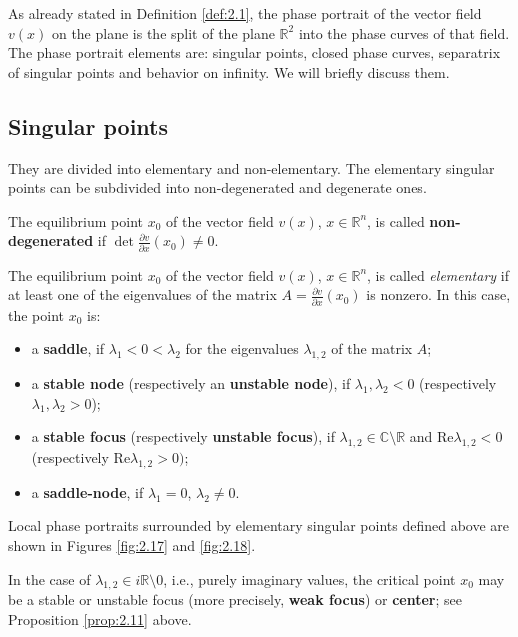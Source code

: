 As already stated in Definition \ref{def:2.1}, the phase portrait of the vector field $v (x)$ on the plane is the split of the plane $\mathbb{R}^{2}$ into the phase curves of that field. The phase portrait elements are: singular points, closed phase curves, separatrix of singular points and behavior on infinity. We will briefly discuss them.

\subsection{Singular points}
They are divided into elementary and non-elementary. The elementary singular points can be subdivided into non-degenerated and degenerate ones.

\begin{definition}
	The equilibrium point $x_0$ of the vector field $v (x)$, $x \in \mathbb{R}^n$, is called \textbf{non-degenerated} if $\det \frac{\partial v}{\partial x}(x_{0})\not=0.$
	
	The equilibrium point $x_0$ of the vector field $v (x)$, $x \in \mathbb{R}^n$, is called \textit{elementary} if at least one of the eigenvalues of the matrix $A=\frac{\partial v}{\partial x}(x_{0})$ is nonzero. In this case, the point $ x_ {0} $ is:
	\begin{itemize}
		\item a \textbf{saddle}, if $\lambda _{1}<0<\lambda _{2}$ for the eigenvalues $\lambda _{1,2}$ of the matrix $A$;
		\item a \textbf{stable node} (respectively an \textbf{unstable node}), if $\lambda _{1},\lambda _{2}<0$ (respectively $\lambda _{1},\lambda _{2}>0$);
		\item a \textbf{stable focus} (respectively \textbf{unstable focus}), if $\lambda _{1,2}\in \mathbb{C}\setminus \mathbb{R}$ and $\textrm{Re}\lambda _{1,2}<0$ (respectively  $\textrm{Re}\lambda _{1,2}>0)$;
		\item a \textbf{saddle-node}, if $\lambda _{1}=0$, $\lambda _{2}\not=0.$
	\end{itemize}
\end{definition}

Local phase portraits surrounded by elementary singular points defined above are shown in Figures \ref{fig:2.17} and \ref{fig:2.18}.

\begin{remark}
	In the case of $\lambda _{1,2}\in i\mathbb{R}\setminus 0$, i.e., purely imaginary values, the critical point $x_0$ may be a stable or unstable focus (more precisely, \textbf{weak focus}) or \textbf{center}; see Proposition \ref{prop:2.11} above.
\end{remark}

